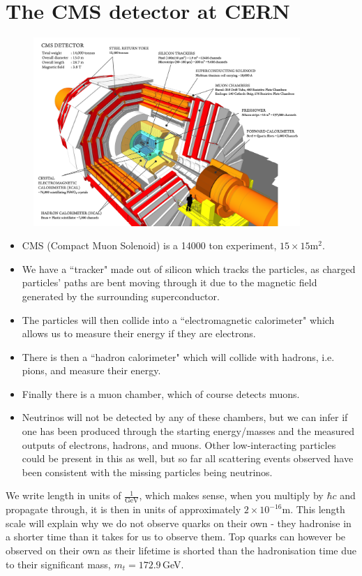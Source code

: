 \documentclass[relqm.tex]{subfiles}
\begin{document}
\section{The CMS detector at CERN}
\begin{figure}[H]
    \centering
    \includegraphics[width=0.9\textwidth]{CMS_160312_06.png}
\end{figure}
\begin{itemize}
    \item CMS (Compact Muon Solenoid) is a 14000 ton experiment, $15\times15$m$^2$.
    \item We have a ``tracker" made out of silicon which tracks the particles, as charged particles' paths are bent moving through it due to the magnetic field generated by the surrounding superconductor.
    \item The particles will then collide into a ``electromagnetic calorimeter" which allows us to measure their energy if they are electrons. 
    \item There is then a ``hadron calorimeter" which will collide with hadrons, i.e. pions, and measure their energy. 
    \item Finally there is a muon chamber, which of course detects muons.
    \item Neutrinos will not be detected by any of these chambers, but we can infer if one has been produced through the starting energy/masses and the measured outputs of electrons, hadrons, and muons. 
        Other low-interacting particles could be present in this as well, but so far all scattering events observed have been consistent with the missing particles being neutrinos.
\end{itemize}
We write length in units of $\frac{1}{\text{GeV}}$, which makes sense, when you multiply by $\hbar c$ and propagate through, it is then in units of approximately $2\times10^{-16}$m.
This length scale will explain why we do not observe quarks on their own - they hadronise in a shorter time than it takes for us to observe them. 
Top quarks can however be observed on their own as their lifetime is shorted than the hadronisation time due to their significant mass, $m_t=172.9\,$GeV.
\end{document}
